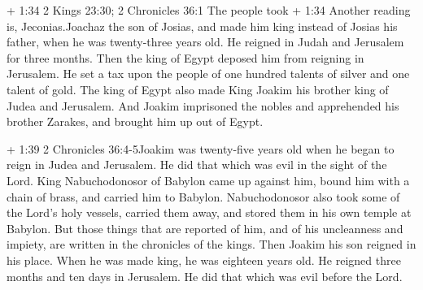  + 1:34 2 Kings 23:30; 2 Chronicles 36:1 The people took +
1:34 Another reading is, Jeconias.Joachaz the son of Josias, and made
him king instead of Josias his father, when he was twenty-three years
old.  He reigned in Judah and Jerusalem for three months.
Then the king of Egypt deposed him from reigning in Jerusalem.
 He set a tax upon the people of one hundred talents of
silver and one talent of gold.  The king of Egypt also made
King Joakim his brother king of Judea and Jerusalem.  And
Joakim imprisoned the nobles and apprehended his brother Zarakes, and
brought him up out of Egypt.

 + 1:39 2 Chronicles 36:4-5Joakim was twenty-five years old
when he began to reign in Judea and Jerusalem. He did that which was
evil in the sight of the Lord.  King Nabuchodonosor of
Babylon came up against him, bound him with a chain of brass, and
carried him to Babylon.  Nabuchodonosor also took some of
the Lord's holy vessels, carried them away, and stored them in his own
temple at Babylon.  But those things that are reported of
him, and of his uncleanness and impiety, are written in the chronicles
of the kings.  Then Joakim his son reigned in his place.
When he was made king, he was eighteen years old.  He
reigned three months and ten days in Jerusalem. He did that which was
evil before the Lord.

